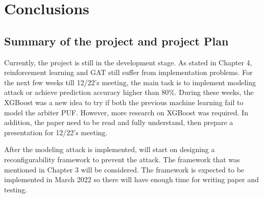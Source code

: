 \chapter{Conclusions}

\section{Summary of the project and project Plan}
Currently, the project is still in the development stage. As stated in Chapter 4, reinforcement learning and GAT still suffer from implementation problems. For the next few weeks till 12/22's meeting,
the main task is to implement modeling attack or achieve prediction accuracy higher than 80\%. During these weeks, the XGBoost was a new idea to try if both the previous machine learning fail to model the arbiter PUF. 
However, more research on XGBoost was required. In addition, the paper \cite{Reference11} need to be read and fully understand, then prepare a presentation for 12/22's meeting.

After the modeling attack is implemented, will start on designing a reconfigurability framework to prevent the attack. The framework that was mentioned in Chapter 3 will be considered. The framework
is expected to be implemented in March 2022 so there will have enough time for writing paper and testing.
